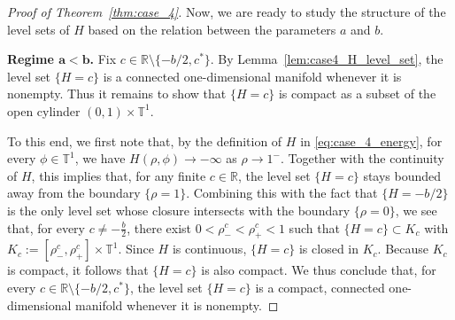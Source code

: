 \documentclass[10pt]{article}
\theoremstyle{definition}
\theoremstyle{definition}
\numberwithin{equation}{section}
\newcommand{\R}{\mathbb{R}}
\newcommand{\BBT}{\mathbb{T}}
\begin{document}
\begin{proof}[Proof of Theorem~\ref{thm:case_4}]
Now, we are ready to study the structure of the level sets of $H$ based on the relation between the parameters $a$ and $b$.

\textbf{Regime $\mathbf{a < b}$.}
Fix $c \in \R \setminus \{-b/2, c^*\}$. 
By Lemma~\ref{lem:case4_H_level_set}, the level set $\{H=c\}$ is a connected one-dimensional manifold whenever it is nonempty.
Thus it remains to show that $\{H = c\}$ is compact as a subset of the open cylinder $(0,1) \times \BBT^1$. 

To this end, we first note that, by the definition of $H$ in \eqref{eq:case_4_energy}, for every $\phi \in \BBT^1$, we have $H(\rho, \phi) \to -\infty$ as $\rho \to 1^-$.  
Together with the continuity of $H$, this implies that, for any finite $c \in \R$, the level set $\{H = c\}$ stays bounded away from the boundary $\{\rho = 1\}$.  
Combining this with the fact that $\{H = -b/2\}$ is the only level set whose closure intersects with the boundary $\{\rho=0\}$, we see that, for every $c \neq -\frac{b}{2}$, there exist $0 < \rho_-^c < \rho_+^c < 1$ such that $\{H = c\} \subset K_c$ with $K_c := [\rho_-^c, \rho_+^c] \times \BBT^1$.   
Since $H$ is continuous, $\{H = c\}$ is closed in $K_c$.  
Because $K_c$ is compact, it follows that $\{H = c\}$ is also compact. 
We thus conclude that, for every $c \in \R \setminus \{-b/2, c^*\}$, the level set $\{H=c\}$ is a compact, connected one-dimensional manifold whenever it is nonempty.


\end{proof}
\end{document}
